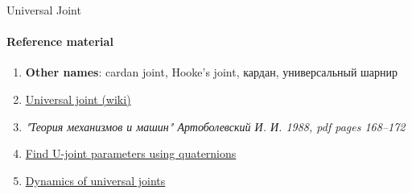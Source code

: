 \documentclass[aspectratio=169]{beamer}
\begin{document}
\begin{frame}[t]{Universal Joint}
    \framesubtitle{Reference material}
    \begin{enumerate}
        \item \textbf{Other names}: cardan joint, Hooke's joint, кардан, универсальный шарнир
        \item \href{https://en.wikipedia.org/wiki/Universal_joint}{Universal joint (wiki)}
        \item \textit{"Теория механизмов и машин" Артоболевский И. И. 1988, pdf pages 168--172 }
        \item \href{https://elar.urfu.ru/bitstream/10995/102516/1/2-s2.0-85107367228.pdf}{Find U-joint parameters using quaternions}
        \item \href{https://www.researchgate.net/publication/257774799_Dynamics_of_universal_joints_its_failures_and_some_propositions_for_practically_improving_its_performance_and_life_expectancy}{Dynamics of universal joints}
    \end{enumerate}
\end{frame}
\end{document}
